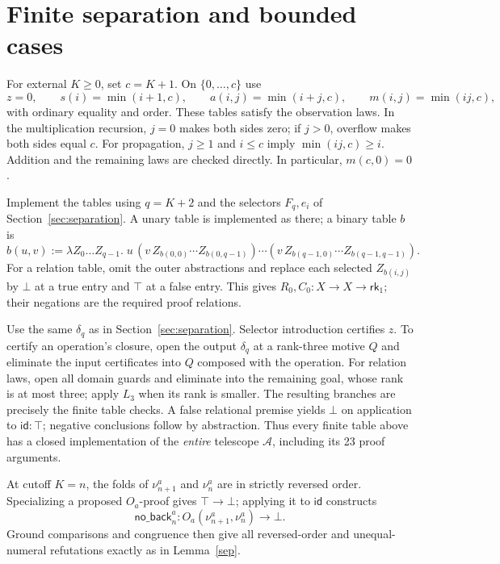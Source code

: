 \documentclass[11pt,a4paper]{article}
\newcommand{\rk}[1]{\mathsf{rk}_{#1}}
\newcommand{\Oa}{O_a}
\newcommand{\nua}[1]{\nu^{a}_{#1}}
\theoremstyle{remark}\newtheorem*{remark}{Remark}
\begin{document}
\section{Finite separation and bounded cases}\label{sec:arith-finite}
For external $K\ge0$, set $c=K+1$. On $\{0,\ldots,c\}$ use
\[
 z=0,\qquad s(i)=\min(i+1,c),\qquad
 a(i,j)=\min(i+j,c),\qquad m(i,j)=\min(ij,c),
\]
with ordinary equality and order. These tables satisfy the observation
laws. In the multiplication recursion, $j=0$ makes both sides zero; if
$j>0$, overflow makes both sides equal $c$. For propagation,
$j\ge1$ and $i\le c$ imply $\min(ij,c)\ge i$. Addition and the remaining
laws are checked directly. In particular, $m(c,0)=0$.

Implement the tables using $q=K+2$ and the selectors $F_q,e_i$ of
Section~\ref{sec:separation}. A unary table is implemented as there; a
binary table $b$ is
\[
 \widehat b(u,v):=\lambda Z_0\ldots Z_{q-1}.\;
 u\,(v\,Z_{b(0,0)}\cdots Z_{b(0,q-1)})\cdots
   (v\,Z_{b(q-1,0)}\cdots Z_{b(q-1,q-1)}).
\]
For a relation table, omit the outer abstractions and replace each
selected $Z_{b(i,j)}$ by $\bot$ at a true entry and $\top$ at a false
entry. This gives $R_0,C_0:X\to X\to\rk1$; their negations are the
required proof relations.

Use the same $\delta_q$ as in Section~\ref{sec:separation}.
Selector introduction certifies $z$. To certify an operation's closure,
open the output $\delta_q$ at a rank-three motive $Q$ and eliminate the
input certificates into $Q$ composed with the operation. For relation
laws, open all domain guards and eliminate into the remaining goal,
whose rank is at most three; apply $L_3$ when its rank is smaller.
The resulting branches are precisely the finite table checks. A false
relational premise yields $\bot$ on application to $\mathsf{id}:\top$;
negative conclusions follow by abstraction. Thus every finite table
above has a closed implementation of the \emph{entire} telescope
$\mathcal A$, including its 23 proof arguments.

At cutoff $K=n$, the folds of $\nua{n+1}$ and $\nua n$ are in strictly
reversed order. Specializing a proposed $\Oa$-proof gives $\top\to\bot$;
applying it to $\mathsf{id}$ constructs
\[
 \mathsf{no\_back}^{a}_n:
 \Oa(\nua{n+1},\nua n)\to\bot.
\]
Ground comparisons and congruence then give all reversed-order and
unequal-numeral refutations exactly as in Lemma~\ref{sep}.

\end{document}
